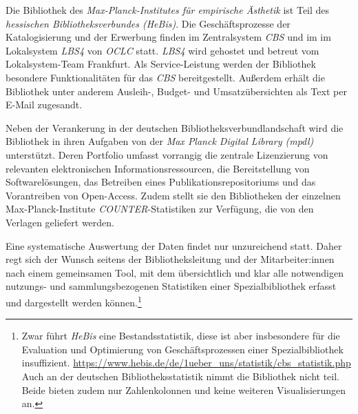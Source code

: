 Die Bibliothek des \textit{Max-Planck-Institutes für empirische Ästhetik}
ist Teil des \textit{hessischen Bibliotheksverbundes (HeBis)}. Die Geschäftsprozesse
der Katalogisierung und der Erwerbung finden im Zentralsystem \textit{CBS} und im im Lokalsystem \textit{LBS4} von
\textit{OCLC} statt. \textit{LBS4} wird gehostet und betreut vom Lokalsystem-Team Frankfurt. Als Service-Leistung werden der Bibliothek besondere Funktionalitäten
für das \textit{CBS} bereitgestellt. Außerdem erhält die Bibliothek unter anderem Ausleih-, Budget- und
Umsatzübersichten als Text per E-Mail zugesandt.


Neben der Verankerung in der deutschen Bibliotheksverbundlandschaft
wird die Bibliothek in ihren Aufgaben von der
\textit{Max Planck Digital Library (mpdl)}
unterstützt. Deren Portfolio umfasst vorrangig die zentrale Lizenzierung
von relevanten elektronischen Informationsressourcen, die Bereitstellung
von Softwarelösungen, das Betreiben eines Publikationsrepositoriums und
das Vorantreiben von Open-Access. Zudem stellt sie den Bibliotheken der einzelnen Max-Planck-Institute
\textit{COUNTER}-Statistiken zur Verfügung, die von den Verlagen geliefert werden.



Eine systematische Auswertung der Daten findet nur unzureichend statt.
Daher regt sich der Wunsch seitens der Bibliotheksleitung und der Mitarbeiter:innen nach einem gemeinsamen Tool,
mit dem übersichtlich und klar alle notwendigen nutzungs- und sammlungsbezogenen Statistiken einer
Spezialbibliothek erfasst und dargestellt werden können.\footnote{Zwar führt \textit{HeBis} eine Bestandsstatistik, diese ist aber insbesondere für die
Evaluation und Optimierung von Geschäftsprozessen einer Spezialbibliothek
insuffizient. \url{https://www.hebis.de/de/1ueber_uns/statistik/cbs_statistik.php} 
Auch an der deutschen Bibliotheksstatistik nimmt die Bibliothek nicht teil. Beide bieten zudem nur Zahlenkolonnen und keine weiteren Visualisierungen an.}

